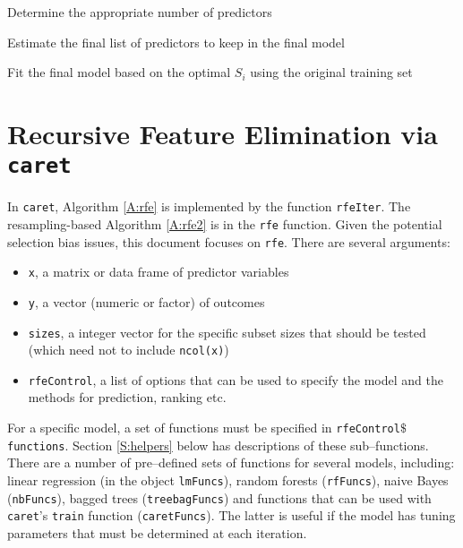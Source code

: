 \documentclass[12pt]{article}
\begin{document}
\begin{algorithm}
    \vspace*{3pt} Determine the appropriate number of predictors \vspace*{3pt}\;
    
   \vspace*{3pt}  Estimate the final list of predictors to keep in the final model\vspace*{3pt}\;

    \vspace*{3pt} Fit the final model based on the optimal $S_i$ using the original training set \vspace*{3pt}\;    
    
\end{algorithm}

\clearpage
\section{Recursive Feature Elimination via \texttt{caret}}

In \texttt{caret}, Algorithm \ref{A:rfe} is implemented by the function \texttt{rfeIter}. The resampling-based Algorithm \ref{A:rfe2} is in the \texttt{rfe} function. Given the potential selection bias issues, this document focuses on \texttt{rfe}.  There are several arguments:
\begin{itemize}
\item \texttt{x}, a matrix or data frame of predictor variables
\item \texttt{y}, a vector (numeric or factor) of outcomes
\item \texttt{sizes}, a integer vector for the specific subset sizes that should be tested (which need not to include \texttt{ncol(x)}) 
\item \texttt{rfeControl}, a list of options that can be used to specify the model and the methods for prediction, ranking etc.
\end{itemize}
For a specific model, a set of functions must be specified in \texttt{rfeControl$\$$functions}. Section \ref{S:helpers} below has descriptions of these sub--functions. There are a number of pre--defined sets of functions for several models, including: linear regression (in the object \texttt{lmFuncs}), random forests (\texttt{rfFuncs}), naive Bayes (\texttt{nbFuncs}), bagged trees (\texttt{treebagFuncs}) and functions that can be used with \texttt{caret}'s \texttt{train} function (\texttt{caretFuncs}). The latter is useful if the model has tuning parameters that must be determined at each iteration.
\end{document}
